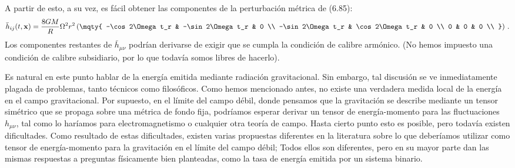 \documentclass[11pt,b5paper,openany,twoside]{book}
\newcommand{\mn}{{\mu\nu}}
\def\bh{{\bar h}}
\def\x{\mathbf{x}}
\begin{document}
A partir de esto, a su vez, es fácil obtener las componentes de la perturbación métrica de (6.85):
\begin{equation}
\bh_{ij}(t,\x) = {{8GM}\over R}\Omega^2r^2\left(\mqty{
-\cos2\Omega t_r & -\sin2\Omega t_r & 0 \\
-\sin2\Omega t_r & \cos2\Omega t_r & 0  \\
0 & 0 & 0 \\ }\right)\,.\label{6.94}
\end{equation}
Los componentes restantes de $\bh_\mn$ podrían derivarse de exigir que se cumpla la condición de calibre armónico.
(No hemos impuesto una condición de calibre subsidiario, por lo que todavía somos libres de hacerlo).

Es natural en este punto hablar de la energía emitida mediante radiación gravitacional.
Sin embargo, tal discusión se ve inmediatamente plagada de problemas, tanto técnicos como filosóficos.
Como hemos mencionado antes, no existe una verdadera medida local de la energía en el campo gravitacional.
Por supuesto, en el límite del campo débil, donde pensamos que la gravitación se describe mediante un tensor simétrico que se propaga sobre una métrica de fondo fija, podríamos esperar derivar un tensor de energía-momento para las fluctuaciones $h_\mn$, tal como lo haríamos para electromagnetismo o cualquier otra teoría de campo.
Hasta cierto punto esto es posible, pero todavía existen dificultades.
Como resultado de estas dificultades, existen varias propuestas diferentes en la literatura sobre lo que deberíamos utilizar como tensor de energía-momento para la gravitación en el límite del campo débil; Todos ellos son diferentes, pero en su mayor parte dan las mismas respuestas a preguntas físicamente bien planteadas, como la tasa de energía emitida por un sistema binario.
\end{document}
